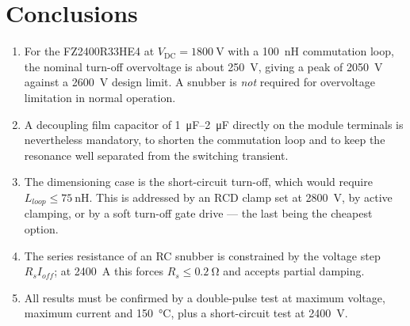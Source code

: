 \documentclass[11pt,a4paper]{article}
\newcommand{\Vdc}{V_{\mathrm{DC}}}
\begin{document}
\section{Conclusions}

\begin{enumerate}[nosep]
\item For the FZ2400R33HE4 at $\Vdc = \SI{1800}{\volt}$ with a
      \SI{100}{\nano\henry} commutation loop, the nominal turn-off overvoltage
      is about \SI{250}{\volt}, giving a peak of \SI{2050}{\volt} against a
      \SI{2600}{\volt} design limit. A snubber is \emph{not} required for
      overvoltage limitation in normal operation.
\item A decoupling film capacitor of \SIrange{1}{2}{\micro\farad} directly on
      the module terminals is nevertheless mandatory, to shorten the
      commutation loop and to keep the resonance well separated from the
      switching transient.
\item The dimensioning case is the short-circuit turn-off, which would require
      $L_{loop} \le \SI{75}{\nano\henry}$. This is addressed by an RCD clamp
      set at \SI{2800}{\volt}, by active clamping, or by a soft turn-off gate
      drive --- the last being the cheapest option.
\item The series resistance of an RC snubber is constrained by the voltage
      step $R_s I_{off}$; at \SI{2400}{\ampere} this forces
      $R_s \le \SI{0.2}{\ohm}$ and accepts partial damping.
\item All results must be confirmed by a double-pulse test at maximum voltage,
      maximum current and \SI{150}{\celsius}, plus a short-circuit test at
      \SI{2400}{\volt}.
\end{enumerate}
\end{document}
